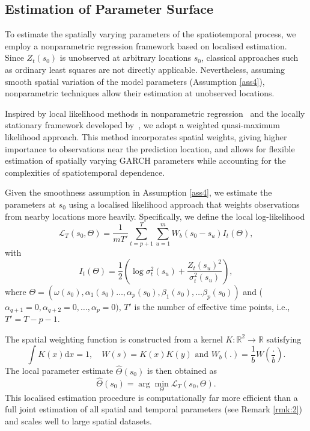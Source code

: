 \documentclass[fleqn,11pt]{article}
\begin{document}
\subsection{Estimation of Parameter Surface}\label{sec:estimation}



To estimate the spatially varying parameters of the spatiotemporal process, we employ a nonparametric regression framework based on localised estimation. Since $Z_t(s_0)$ is unobserved at arbitrary locations $s_0$, classical approaches such as ordinary least squares are not directly applicable. Nevertheless, assuming smooth spatial variation of the model parameters (Assumption \ref{ass4}), nonparametric techniques allow their estimation at unobserved locations.

Inspired by local likelihood methods in nonparametric regression~\cite{tibshirani1987local} and the locally stationary framework developed by~\cite{Dahlhaus}, we adopt a weighted quasi-maximum likelihood approach. This method incorporates spatial weights, giving higher importance to observations near the prediction location, and allows for flexible estimation of spatially varying GARCH parameters while accounting for the complexities of spatiotemporal dependence.


Given the smoothness assumption in Assumption \ref{ass4}, we estimate the parameters at $s_0$ using a localised likelihood approach that weights observations from nearby locations more heavily. Specifically, we define the local log-likelihood
\begin{equation}
\mathcal{L}_{ T}\left(s_0, \Theta\right)= \frac{1}{m T'} \sum_{t=p+1}^T \sum_{u=1}^m W_b\left(s_0-s_u\right) I_{t} ( \Theta), 
\end{equation}
with
\begin{equation}
I_{t} ( \Theta) =\frac{1}{2} \left( \log \sigma_t^2(s_u) + \frac{Z_t(s_u)^2}{\sigma_t^2(s_u)} \right),
\end{equation}
where $\Theta = \left(\omega \left(s_0\right), \alpha_1(s_0)\ldots, \alpha_p\left(s_0\right) , \beta_1(s_0), \dots \beta_p(s_0)\right)$ and  ($ \alpha_{q+1}=0, \alpha_{q+2}=0 ,\dots, \alpha_{p}=0)$, $T'$ is the number of effective time points, i.e., $T' = T-p-1$.

The spatial weighting function is constructed from a kernel $K: \mathbb{R}^2 \rightarrow \mathbb{R}$ satisfying
\begin{equation}
    \int K(x) \mathrm{d} x=1, \quad W(s)=K(x) K(y) \text { and } W_b(.)=\frac{1}{b} W\left(\frac{.}{b}\right) . 
\end{equation}
The local parameter estimate $\hat{\Theta}(s_0)$ is then obtained as
\begin{equation}\label{eq:estiamtor}
\hat{\Theta}(s_0) = \arg \min_{\Theta} \mathcal{L}_{ T}\left(s_0, \Theta\right).
\end{equation}
This localised estimation procedure is computationally far more efficient than a full joint estimation of all spatial and temporal parameters (see Remark \ref{rmk:2}) and scales well to large spatial datasets.
\end{document}
